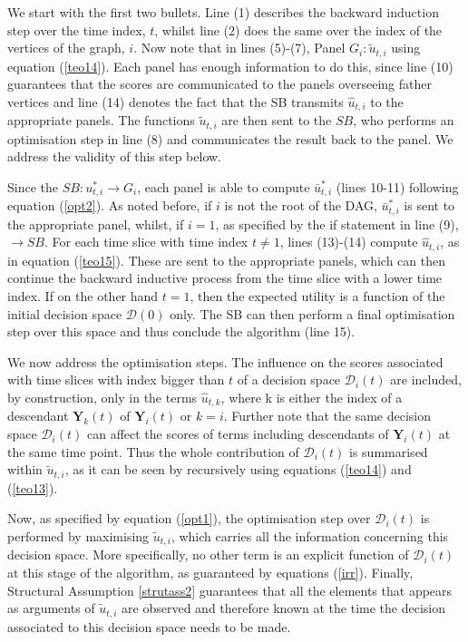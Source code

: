 We start with the first two bullets.  Line (1) describes the backward induction step over the time index, $t$, whilst line (2) does the same over the index of the vertices of the graph, $i$. Now note that in lines (5)-(7), Panel $G_i:\tilde{u}_{t,i}$ using equation (\ref{teo14}). Each panel has enough information to do this, since line (10) guarantees that the scores are communicated to the panels overseeing father vertices and line (14) denotes the fact that the SB transmits $\hat{u}_{t,i}$ to the appropriate panels.   The functions $\tilde{u}_{t,i}$ are then sent to the  $SB$, who performs an optimisation step in line (8) and communicates the result back to the panel. We address the validity of this step below.

 Since the $SB:u^*_{t,i}\longrightarrow G_i$, each panel is able to compute $\bar{u}^*_{t,i}$ (lines 10-11) following equation (\ref{opt2}). As noted before, if $i$ is not the root of the DAG, $\bar{u}^*_{t,i}$ is sent to the appropriate panel, whilst, if $i=1$, as specified by the if statement in line (9), $\longrightarrow SB$. For each time slice with time index $t\neq 1$, lines (13)-(14) compute $\hat{u}_{t,i}$, as  in equation (\ref{teo15}).  These are sent to the appropriate panels, which can then continue the backward inductive process from the time slice with a lower time index. If on the other hand $t=1$, then the expected utility is a function of the initial decision space $\mathcal{D}(0)$ only. The SB can then perform a final optimisation step over this space and thus conclude the algorithm (line 15).

We now address the optimisation steps. The influence on the scores associated with time slices with index bigger than $t$ of a decision space $\mathcal{D}_i(t)$ are included, by construction, only in the terms $\hat{u}_{t,k}$, where k is either the index of a descendant $\bm{Y}_k(t)$ of $\bm{Y}_i(t)$ or $k=i$. Further note that the same decision space $\mathcal{D}_i(t)$ can affect the scores of terms including descendants of $\bm{Y}_i(t)$ at the same time point. Thus the whole contribution of $\mathcal{D}_i(t)$ is  summarised within $\tilde{u}_{t,i}$, as it can be seen by recursively using equations (\ref{teo14}) and (\ref{teo13}).

Now, as specified by equation (\ref{opt1}), the optimisation step over $\mathcal{D}_i(t)$ is performed by maximising $\tilde{u}_{t,i}$, which carries all the information concerning this decision space. More specifically, no other term is an explicit function of $\mathcal{D}_i(t)$ at this stage of the algorithm, as guaranteed by equations (\ref{irr}). Finally, Structural Assumption \ref{strutass2} guarantees that all the elements that appears as arguments of $\tilde{u}_{t,i}$ are observed and therefore known at the time the decision associated to this decision space  needs to be made. 

